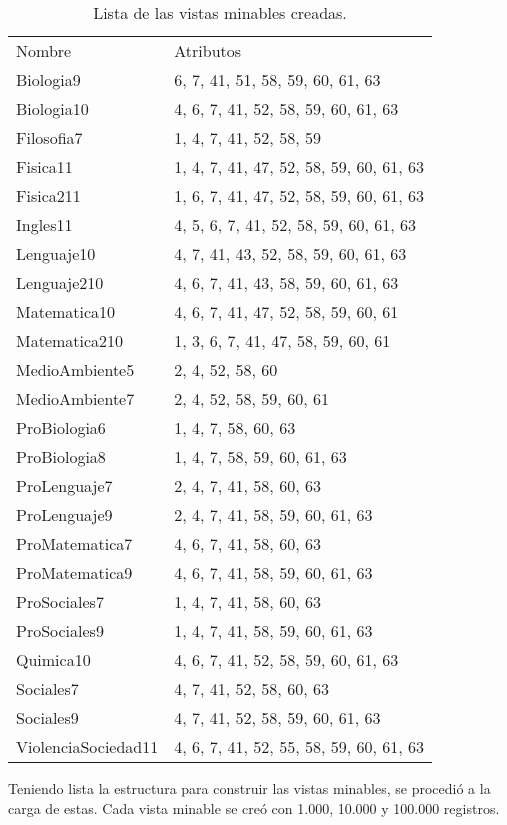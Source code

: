 \begin{table}[!Hhtb]
\centering
\begin{tabular}{|p{3.5cm}|p{7cm}|}
\hline
	\rowcolor[gray]{0.9} 
	\multicolumn{2}{|c|}{
	\textbf{Vistas minables}}\\
\hline
	\rowcolor[gray]{0.5}
	Nombre & Atributos\\
\hline
Biologia9 & 6, 7, 41, 51, 58, 59, 60, 61, 63 \\
\hline
Biologia10 & 4, 6, 7, 41, 52, 58, 59, 60, 61, 63 \\
\hline
Filosofia7 & 1, 4, 7, 41, 52, 58, 59 \\
\hline
Fisica11 & 1, 4, 7, 41, 47, 52, 58, 59, 60, 61, 63 \\
\hline
Fisica211 & 1, 6, 7, 41, 47, 52, 58, 59, 60, 61, 63 \\
\hline
Ingles11 & 4, 5, 6, 7, 41, 52, 58, 59, 60, 61, 63 \\
\hline
Lenguaje10 & 4, 7, 41, 43, 52, 58, 59, 60, 61, 63 \\
\hline
Lenguaje210 & 4, 6, 7, 41, 43, 58, 59, 60, 61, 63 \\
\hline
Matematica10 & 4, 6, 7, 41, 47, 52, 58, 59, 60, 61 \\
\hline
Matematica210 & 1, 3, 6, 7, 41, 47, 58, 59, 60, 61 \\
\hline
MedioAmbiente5 & 2, 4, 52, 58, 60 \\
\hline
MedioAmbiente7 & 2, 4, 52, 58, 59, 60, 61 \\
\hline
ProBiologia6 & 1, 4, 7, 58, 60, 63 \\
\hline
ProBiologia8 & 1, 4, 7, 58, 59, 60, 61, 63 \\
\hline
ProLenguaje7 & 2, 4, 7, 41, 58, 60, 63 \\
\hline
ProLenguaje9 & 2, 4, 7, 41, 58, 59, 60, 61, 63 \\
\hline
ProMatematica7 & 4, 6, 7, 41, 58, 60, 63 \\
\hline
ProMatematica9 & 4, 6, 7, 41, 58, 59, 60, 61, 63 \\
\hline
ProSociales7 & 1, 4, 7, 41, 58, 60, 63 \\
\hline
ProSociales9 & 1, 4, 7, 41, 58, 59, 60, 61, 63 \\
\hline
Quimica10 & 4, 6, 7, 41, 52, 58, 59, 60, 61, 63 \\
\hline
Sociales7 & 4, 7, 41, 52, 58, 60, 63  \\
\hline
Sociales9 & 4, 7, 41, 52, 58, 59, 60, 61, 63  \\
\hline
ViolenciaSociedad11 & 4, 6, 7, 41, 52, 55, 58, 59, 60, 61, 63 \\
\hline
\end{tabular}
\caption{Lista de las vistas minables creadas.}
\label{tab:cuadro32}
\end{table}
Teniendo lista la estructura para construir las vistas minables, se procedió a la carga de estas. Cada vista minable se creó con 1.000, 10.000 y 100.000 registros.

